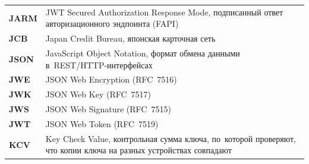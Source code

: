 \begin{longtable}{@{}p{4.5em}p{\dimexpr\linewidth-4.5em-2\tabcolsep\relax}@{}}
  \textbf{JARM}              & JWT Secured Authorization Response Mode, подписанный ответ авторизационного эндпоинта (FAPI)                                                                                                                                                                                                     \\
  \textbf{JCB}               & Japan Credit Bureau, японская карточная сеть                                                                                                                                                                                                                                                    \\
  \textbf{JSON}              & JavaScript Object Notation, формат обмена данными в~REST/HTTP-интерфейсах                                                                                                                                                                                                                        \\
  \textbf{JWE}               & JSON Web Encryption (RFC~7516)                                                                                                                                                                                                                                                                   \\
  \textbf{JWK}               & JSON Web Key (RFC~7517)                                                                                                                                                                                                                                                                          \\
  \textbf{JWS}               & JSON Web Signature (RFC~7515)                                                                                                                                                                                                                                                                    \\
  \textbf{JWT}               & JSON Web Token (RFC~7519)                                                                                                                                                                                                                                                                        \\
  \textbf{KCV}               & Key Check Value, контрольная сумма ключа, по~которой проверяют, что копии ключа на разных устройствах совпадают                                                                                                                                                                                            \\

\end{longtable}
